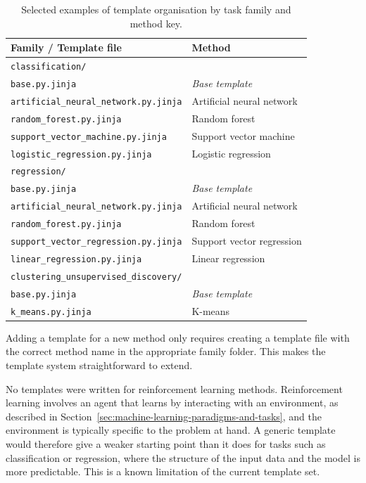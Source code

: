 \begin{table}[H]
\centering
\caption[Template folder structure]{Selected examples of template 
organisation by task family and method key.}
\label{tab:template-structure}
\begin{tabular}{ll}
\toprule
\textbf{Family / Template file} & \textbf{Method} \\
\midrule
\multicolumn{2}{l}{\texttt{classification/}} \\
\quad\texttt{base.py.jinja} & \textit{Base template} \\
\quad\texttt{artificial\_neural\_network.py.jinja} & Artificial neural network \\
\quad\texttt{random\_forest.py.jinja} & Random forest \\
\quad\texttt{support\_vector\_machine.py.jinja} & Support vector machine \\
\quad\texttt{logistic\_regression.py.jinja} & Logistic regression \\
\midrule
\multicolumn{2}{l}{\texttt{regression/}} \\
\quad\texttt{base.py.jinja} & \textit{Base template} \\
\quad\texttt{artificial\_neural\_network.py.jinja} & Artificial neural network \\
\quad\texttt{random\_forest.py.jinja} & Random forest \\
\quad\texttt{support\_vector\_regression.py.jinja} & Support vector regression \\
\quad\texttt{linear\_regression.py.jinja} & Linear regression \\
\midrule
\multicolumn{2}{l}{\texttt{clustering\_unsupervised\_discovery/}} \\
\quad\texttt{base.py.jinja} & \textit{Base template} \\
\quad\texttt{k\_means.py.jinja} & K-means \\
\bottomrule
\end{tabular}
\end{table}

Adding a template for a new method only requires 
creating a template file with the correct method 
name in the appropriate family folder. This makes the 
template system straightforward to extend.

No templates were written for reinforcement learning methods. 
Reinforcement learning involves an agent that learns by 
interacting with an environment, as described in 
Section~\ref{sec:machine-learning-paradigms-and-tasks}, and 
the environment is typically specific to the problem at hand. 
A generic template would therefore give a weaker starting point
than it does for tasks such as classification or regression, where
the structure of the input data and the model is more predictable.
This is a known limitation of the current template set.